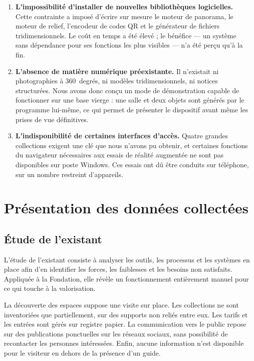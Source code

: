 \begin{enumerate}
  \item \textbf{L'impossibilité d'installer de nouvelles bibliothèques
        logicielles.} Cette contrainte a imposé d'écrire sur mesure le moteur de
        panorama, le moteur de relief, l'encodeur de codes QR et le générateur
        de fichiers tridimensionnels. Le coût en temps a été élevé ; le bénéfice
        — un système sans dépendance pour ses fonctions les plus visibles — n'a
        été perçu qu'à la fin.

  \item \textbf{L'absence de matière numérique préexistante.} Il n'existait ni
        photographies à 360~degrés, ni modèles tridimensionnels, ni notices
        structurées. Nous avons donc conçu un mode de démonstration capable de
        fonctionner sur une base vierge : une salle et deux objets sont générés
        par le programme lui-même, ce qui permet de présenter le dispositif
        avant même les prises de vue définitives.

  \item \textbf{L'indisponibilité de certaines interfaces d'accès.} Quatre
        grandes collections exigent une clé que nous n'avons pu obtenir, et
        certaines fonctions du navigateur nécessaires aux essais de réalité
        augmentée ne sont pas disponibles sur poste Windows. Ces essais ont dû
        être conduits sur téléphone, sur un nombre restreint d'appareils.
\end{enumerate}

\section{Présentation des données collectées}
\label{sec:donnees}

\subsection{Étude de l'existant}

L'étude de l'existant consiste à analyser les outils, les processus et les
systèmes en place afin d'en identifier les forces, les faiblesses et les besoins
non satisfaits. Appliquée à la Fondation, elle révèle un fonctionnement
entièrement manuel pour ce qui touche à la valorisation.

La découverte des espaces suppose une visite sur place. Les collections ne sont
inventoriées que partiellement, sur des supports non reliés entre eux. Les
tarifs et les entrées sont gérés sur registre papier. La communication vers le
public repose sur des publications ponctuelles sur les réseaux sociaux, sans
possibilité de recontacter les personnes intéressées. Enfin, aucune information
n'est disponible pour le visiteur en dehors de la présence d'un guide.

